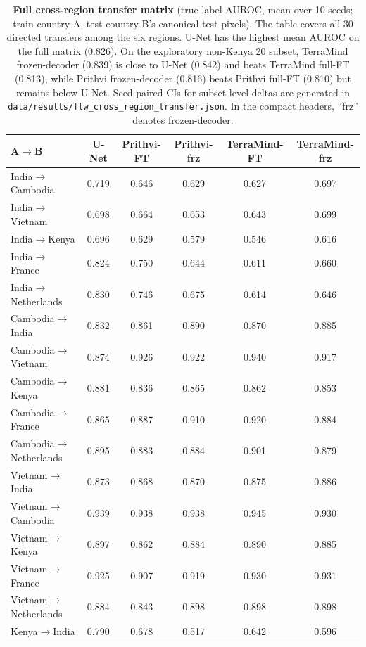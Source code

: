 \documentclass{article}
\newcommand{\tablebodygap}{\vspace{0.45em}}
\begin{document}
\begin{table}[H]\centering\scriptsize
\setlength{\tabcolsep}{3pt}\renewcommand{\arraystretch}{0.85}
\caption{\textbf{Full cross-region transfer matrix} (true-label AUROC, mean
over 10 seeds; train country A, test country B's canonical test pixels). The table
covers all 30 directed transfers among the six regions. U-Net has the highest mean AUROC
on the full matrix (0.826). On the exploratory non-Kenya 20 subset, TerraMind frozen-decoder (0.839) is
close to U-Net (0.842) and beats TerraMind full-FT (0.813), while Prithvi frozen-decoder
(0.816) beats Prithvi full-FT (0.810) but remains below U-Net. Seed-paired CIs for
subset-level deltas are generated in \texttt{data/results/ftw\_cross\_region\_transfer.json}.
In the compact headers, ``frz'' denotes frozen-decoder.}
\label{tab:xfer-full}
\tablebodygap
\begin{tabular}{lccccc}
\toprule
A$\rightarrow$B & U-Net & Prithvi-FT & Prithvi-frz & TerraMind-FT & TerraMind-frz \\
\midrule
India$\to$Cambodia & 0.719 & 0.646 & 0.629 & 0.627 & 0.697 \\
India$\to$Vietnam & 0.698 & 0.664 & 0.653 & 0.643 & 0.699 \\
India$\to$Kenya & 0.696 & 0.629 & 0.579 & 0.546 & 0.616 \\
India$\to$France & 0.824 & 0.750 & 0.644 & 0.611 & 0.660 \\
India$\to$Netherlands & 0.830 & 0.746 & 0.675 & 0.614 & 0.646 \\
Cambodia$\to$India & 0.832 & 0.861 & 0.890 & 0.870 & 0.885 \\
Cambodia$\to$Vietnam & 0.874 & 0.926 & 0.922 & 0.940 & 0.917 \\
Cambodia$\to$Kenya & 0.881 & 0.836 & 0.865 & 0.862 & 0.853 \\
Cambodia$\to$France & 0.865 & 0.887 & 0.910 & 0.920 & 0.884 \\
Cambodia$\to$Netherlands & 0.895 & 0.883 & 0.884 & 0.901 & 0.879 \\
Vietnam$\to$India & 0.873 & 0.868 & 0.870 & 0.875 & 0.886 \\
Vietnam$\to$Cambodia & 0.939 & 0.938 & 0.938 & 0.945 & 0.930 \\
Vietnam$\to$Kenya & 0.897 & 0.862 & 0.884 & 0.890 & 0.885 \\
Vietnam$\to$France & 0.925 & 0.907 & 0.919 & 0.930 & 0.931 \\
Vietnam$\to$Netherlands & 0.884 & 0.843 & 0.898 & 0.898 & 0.898 \\
Kenya$\to$India & 0.790 & 0.678 & 0.517 & 0.642 & 0.596 \\

\end{tabular}
\end{table}
\end{document}
